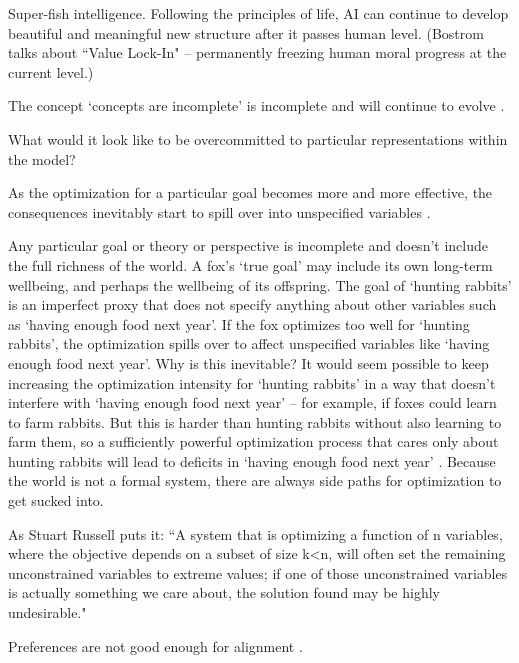 Super-fish intelligence. Following the principles of life, AI can continue to develop beautiful and meaningful new structure after it passes human level. (Bostrom talks about ``Value Lock-In" -- permanently freezing human moral progress at the current level.)

The concept `concepts are incomplete' is incomplete and will continue to evolve \citep{hofstadter1979godel}. 

What would it look like to be overcommitted to particular representations within the model?

As the optimization for a particular goal becomes more and more effective, the consequences inevitably start to spill over into unspecified variables \citep{grossman1986costs, hadfield2019incomplete, zhuang2020consequences}.

Any particular goal or theory or perspective is incomplete and doesn't include the full richness of the world. A fox's `true goal' may include its own long-term wellbeing, and perhaps the wellbeing of its offspring. The goal of `hunting rabbits' is an imperfect proxy that does not specify anything about other variables such as `having enough food next year'. If the fox optimizes too well for `hunting rabbits', the optimization spills over to affect unspecified variables like `having enough food next year'. Why is this inevitable? It would seem possible to keep increasing the optimization intensity for `hunting rabbits' in a way that doesn't interfere with `having enough food next year' -- for example, if foxes could learn to farm rabbits. But this is harder than hunting rabbits without also learning to farm them, so a sufficiently powerful optimization process that cares only about hunting rabbits will lead to deficits in `having enough food next year' \citep{sohldickstein2022efficiency, zhuang2020consequences}. Because the world is not a formal system, there are always side paths for optimization to get sucked into. 

As Stuart Russell puts it: ``A system that is optimizing a function of n variables, where the objective depends on a subset of size k<n, will often set the remaining unconstrained variables to extreme values; if one of those unconstrained variables is actually something we care about, the solution found may be highly undesirable."

Preferences are not good enough for alignment \citep{zhixuan2024beyond, anwar2024foundational, gabriel2020artificial, xuan2022contractualist, tomasik2016hedonistic, eckersley2018impossibility}.


